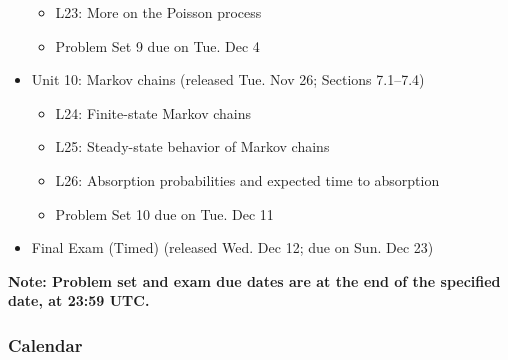 \documentclass[pdftex, brazil, 12pt, twoside]{article}
\begin{document}
\begin{itemize}[noitemsep]
\begin{itemize}[noitemsep]
  \item L23: More on the Poisson process
  \item Problem Set 9 due on Tue. Dec 4
  \end{itemize}
\item Unit 10: Markov chains (released Tue. Nov 26; Sections 7.1--7.4)
  \begin{itemize}[noitemsep]
    \item L24: Finite-state Markov chains
    \item L25: Steady-state behavior of Markov chains
    \item L26: Absorption probabilities and expected time to absorption
    \item Problem Set 10 due on Tue. Dec 11
  \end{itemize}
\item Final Exam (Timed) (released Wed. Dec 12; due on Sun. Dec 23)
\end{itemize}

\textbf{Note: Problem set and exam due dates are at the end of the specified date,
  at 23:59 UTC.}

\subsubsection{Calendar}
\label{ovw0-sy-calendar}
\end{document}
